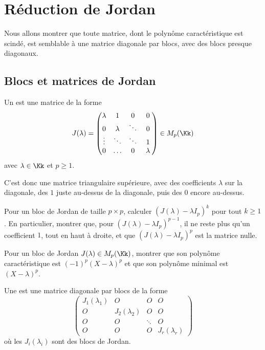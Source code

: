 \documentclass[12pt, class=report,crop=false]{standalone}
\begin{document}
\section{Réduction de Jordan}


Nous allons montrer que toute matrice, dont le polynôme caractéristique est scindé, est semblable à une matrice diagonale par blocs, avec des blocs \og{}presque\fg{} diagonaux.


\subsection{Blocs et matrices de Jordan}


\begin{definition}
Un  est une matrice de la forme
\[J(\lambda) = 
\begin{pmatrix}
\lambda&1&0&\hphantom{\;}0\hphantom{\;}\\
0&\lambda&\ddots&0\\
\vdots&\ddots&\ddots&1\\
0&\ldots&0&\lambda
\end{pmatrix}
\in M_p(\Kk)\]
avec $\lambda \in \Kk$ et $p \ge 1$.
\end{definition}

C'est donc une matrice triangulaire supérieure, avec des coefficients $\lambda$ sur la diagonale, des $1$ juste au-dessus de la diagonale, puis des $0$ encore au-dessus.


\begin{exercicecours}
Pour un bloc de Jordan de taille $p\times p$, calculer $(J(\lambda)-\lambda I_p)^k$ pour tout $k\ge 1$.
En particulier, montrer que, pour 
$(J(\lambda)-\lambda I_p)^{p-1}$, il ne reste plus qu'un coefficient $1$, tout en haut à droite, 
et que $(J(\lambda)-\lambda I_p)^{p}$ est la matrice nulle.
\end{exercicecours}


\begin{exercicecours}
Pour un bloc de Jordan $J(\lambda) \in M_p(\Kk)$,
montrer que son polynôme caractéristique 
est $(-1)^p(X-\lambda)^p$ et que son polynôme minimal 
est $(X-\lambda)^p$.
\end{exercicecours}


\begin{definition}
Une  est une matrice diagonale par blocs de la forme
\[\left(\begin{array}{c|c|c|c}
J_1(\lambda_1)&O&O&O\\\hline
O&J_2(\lambda_2)&O&O\\\hline
O&O&\ddots&O\\\hline
O&O&O&J_r(\lambda_r)
\end{array}\right)\]
où les $J_i(\lambda_i)$ sont des blocs de Jordan.
\end{definition}
\end{document}

